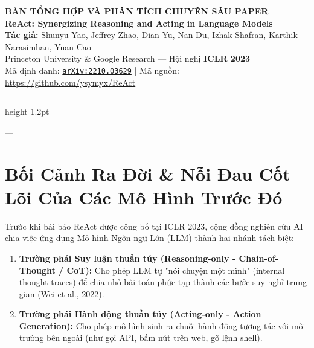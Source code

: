 \documentclass[11pt,a4paper]{article}
\begin{document}
\begin{center}
    {\Large\bfseries BẢN TỔNG HỢP VÀ PHÂN TÍCH CHUYÊN SÂU PAPER}\\[0.3cm]
    {\LARGE\bfseries ReAct: Synergizing Reasoning and Acting in Language Models}\\[0.4cm]
    {\normalsize\textbf{Tác giả:} Shunyu Yao, Jeffrey Zhao, Dian Yu, Nan Du, Izhak Shafran, Karthik Narasimhan, Yuan Cao}\\[0.15cm]
    {\small Princeton University \& Google Research — Hội nghị \textbf{ICLR 2023}}\\[0.15cm]
    {\small Mã định danh: \href{https://arxiv.org/abs/2210.03629}{\texttt{arXiv:2210.03629}} \quad | \quad Mã nguồn: \url{https://github.com/ysymyx/ReAct}}
\end{center}

\vspace{0.3cm}
\hrule height 1.2pt
\vspace{0.6cm}

---

\section{Bối Cảnh Ra Đời \& Nỗi Đau Cốt Lõi Của Các Mô Hình Trước Đó}

Trước khi bài báo ReAct được công bố tại ICLR 2023, cộng đồng nghiên cứu AI chia việc ứng dụng Mô hình Ngôn ngữ Lớn (LLM) thành hai nhánh tách biệt:
\begin{enumerate}[leftmargin=1.8em]
    \item \textbf{Trường phái Suy luận thuần túy (Reasoning-only - Chain-of-Thought / CoT):} Cho phép LLM tự "nói chuyện một mình" (internal thought traces) để chia nhỏ bài toán phức tạp thành các bước suy nghĩ trung gian (Wei et al., 2022).
    \item \textbf{Trường phái Hành động thuần túy (Acting-only - Action Generation):} Cho phép mô hình sinh ra chuỗi hành động tương tác với môi trường bên ngoài (như gọi API, bấm nút trên web, gõ lệnh shell).
\end{enumerate}
\end{document}

